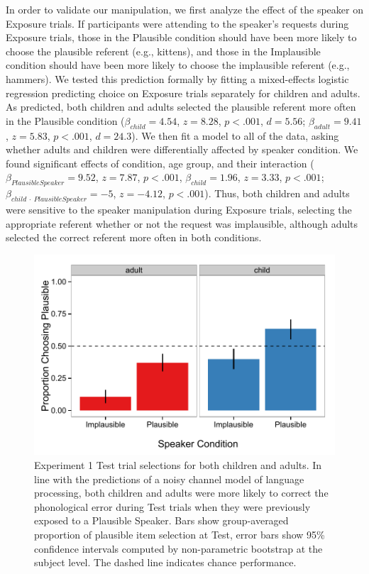 \documentclass[man,floatsintext]{apa6}
\begin{document}
In order to validate our manipulation, we first analyze the effect of the speaker on Exposure trials. If participants were attending to the speaker's requests during Exposure trials, those in the Plausible condition should have been more likely to choose the plausible referent (e.g., kittens), and those in the Implausible condition should have been more likely to choose the implausible referent (e.g., hammers). We tested this prediction formally by fitting a mixed-effects logistic regression predicting choice on Exposure trials separately for children and adults. As predicted, both children and adults selected the plausible referent more often in the Plausible condition ($\beta_{child} = 4.54$,  $z = 8.28$, $p <.001$, $d = 5.56$; $\beta_{adult} = 9.41$,  $z = 5.83$, $p <.001$, $d = 24.3$). We then fit a model to all of the data, asking whether adults and children were differentially affected by speaker condition. We found significant effects of condition, age group, and their interaction ($\beta_{Plausible Speaker} = 9.52$,  $z = 7.87$, $p <.001$,  $\beta_{child} = 1.96$,  $z = 3.33$, $p <.001$; $\beta_{child\: \cdot \: Plausible Speaker} = -5$,  $z = -4.12$, $p <.001$). Thus, both children and adults were sensitive to the speaker manipulation during Exposure trials, selecting the appropriate referent whether or not the request was implausible, although adults selected the correct referent more often in both conditions.

\begin{figure}[t]
\centering
     \includegraphics[width=5in]{figures/exp1_results.pdf}
    \caption{Experiment 1 Test trial selections for both children and adults. In line with the predictions of a noisy channel model of language processing, both children and adults were more likely to correct the phonological error during Test trials when they were previously exposed to a Plausible Speaker. Bars show group-averaged proportion of plausible item selection at Test, error bars show 95\% confidence intervals computed by non-parametric bootstrap at the subject level. The dashed line indicates chance performance.}%
   \label{fig:exp1_results}
\end{figure}
\end{document}

